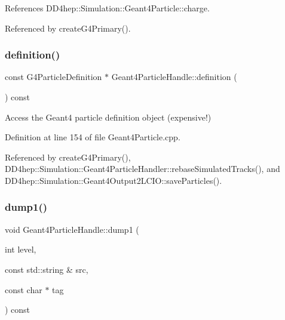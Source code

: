 References D\+D4hep\+::\+Simulation\+::\+Geant4\+Particle\+::charge.



Referenced by create\+G4\+Primary().

\hypertarget{class_d_d4hep_1_1_simulation_1_1_geant4_particle_handle_ab8ba7892c3676dafc9a0b5eae3841f43}{}\label{class_d_d4hep_1_1_simulation_1_1_geant4_particle_handle_ab8ba7892c3676dafc9a0b5eae3841f43} 
\subsubsection{\texorpdfstring{definition()}{definition()}}
{\footnotesize\ttfamily const G4\+Particle\+Definition $\ast$ Geant4\+Particle\+Handle\+::definition (\begin{DoxyParamCaption}{ }\end{DoxyParamCaption}) const}



Access the Geant4 particle definition object (expensive!) 



Definition at line 154 of file Geant4\+Particle.\+cpp.



Referenced by create\+G4\+Primary(), D\+D4hep\+::\+Simulation\+::\+Geant4\+Particle\+Handler\+::rebase\+Simulated\+Tracks(), and D\+D4hep\+::\+Simulation\+::\+Geant4\+Output2\+L\+C\+I\+O\+::save\+Particles().

\hypertarget{class_d_d4hep_1_1_simulation_1_1_geant4_particle_handle_a437a325fa9f57b56a34e3fb52deba62d}{}\label{class_d_d4hep_1_1_simulation_1_1_geant4_particle_handle_a437a325fa9f57b56a34e3fb52deba62d} 
\subsubsection{\texorpdfstring{dump1()}{dump1()}}
{\footnotesize\ttfamily void Geant4\+Particle\+Handle\+::dump1 (\begin{DoxyParamCaption}\item[{int}]{level,  }\item[{const std\+::string \&}]{src,  }\item[{const char $\ast$}]{tag }\end{DoxyParamCaption}) const}



